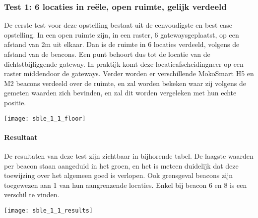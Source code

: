 \subsubsection{Test 1: 6 locaties in reële, open ruimte, gelijk verdeeld}
\begin{minipage}{0.55\textwidth}
De eerste test voor deze opstelling bestaat uit de eenvoudigste en best case opstelling. In een open ruimte zijn, in een raster, 6 gateways\footnotemark geplaatst, op een afstand van 2m uit elkaar. Dan is de ruimte in 6 locaties verdeeld, volgens de afstand van de beacons. Een punt behoort dus tot de locatie van de dichtstbijliggende gateway. In praktijk komt deze locatieafscheiding\footnotemark neer op een raster middendoor de gateways. Verder worden er verschillende MokoSmart H5 en M2 beacons verdeeld over de ruimte, en zal worden bekeken waar zij volgens de gemeten waarden zich bevinden, en zal dit worden vergeleken met hun echte positie.
\end{minipage}
\hfill
\begin{minipage}{0.42\textwidth}
	\texttt{[image: sble\_1\_1\_floor]}
\end{minipage}

\paragraph{Resultaat}
\begin{minipage}{0.55\textwidth}
De resultaten van deze test zijn zichtbaar in bijhorende tabel. De laagste waarden per beacon staan aangeduid in het groen, en het is meteen duidelijk dat deze toewijzing over het algemeen goed is verlopen. Ook grensgeval beacons zijn toegewezen aan 1 van hun aangrenzende locaties. Enkel bij beacon 6 en 8 is een verschil te vinden.
\end{minipage}
\hfill
\begin{minipage}{0.42\textwidth}
	\texttt{[image: sble\_1\_1\_results]}
\end{minipage}

